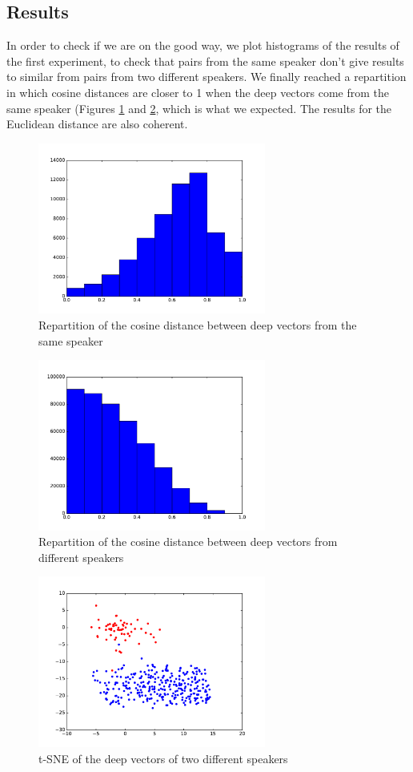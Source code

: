 \documentclass[conference]{IEEEtran}
\begin{document}
\subsection{Results}

In order to check if we are on the good way, we plot histograms of the results of the first experiment, to check that pairs from the same speaker don't give results to similar from pairs from two different speakers. We finally reached a repartition in which cosine distances are closer to 1 when the deep vectors come from the same speaker (Figures \ref{cos_same} and \ref{cos_diff}, which is what we expected. The results for the Euclidean distance are also coherent.

\begin{figure}[!h]
    \centering
    \includegraphics[width=7.5cm]{../secondNet/cosine_same.pdf}
    \caption{Repartition of the cosine distance between deep vectors from the same speaker}
    \label{cos_same}
\end{figure}
\begin{figure}[!h]
    \centering
    \includegraphics[width=7.5cm]{../secondNet/cosine_diff.pdf}
    \caption{Repartition of the cosine distance between deep vectors from different speakers}
	\label{cos_diff}
\end{figure}

\begin{figure}[!h]
    \centering
    \includegraphics[width=7.5cm]{../secondNet/tSNE_HOUDIN_TRUCHOT.pdf}
    \caption{t-SNE of the deep vectors of two different speakers}
	\label{tSNE}
\end{figure}
\end{document}
